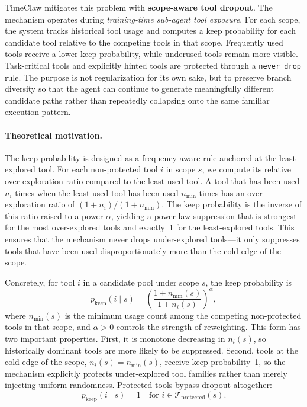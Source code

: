 TimeClaw mitigates this problem with \textbf{scope-aware tool dropout}. The mechanism operates during \emph{training-time sub-agent tool exposure}. For each scope, the system tracks historical tool usage and computes a keep probability for each candidate tool relative to the competing tools in that scope. Frequently used tools receive a lower keep probability, while underused tools remain more visible. Task-critical tools and explicitly hinted tools are protected through a \texttt{never\_drop} rule. The purpose is not regularization for its own sake, but to preserve branch diversity so that the agent can continue to generate meaningfully different candidate paths rather than repeatedly collapsing onto the same familiar execution pattern.

\paragraph{Theoretical motivation.} The keep probability is designed as a frequency-aware rule anchored at the least-explored tool. For each non-protected tool $i$ in scope $s$, we compute its relative over-exploration ratio compared to the least-used tool. A tool that has been used $n_i$ times when the least-used tool has been used $n_{\min}$ times has an over-exploration ratio of $(1+n_i)/(1+n_{\min})$. The keep probability is the inverse of this ratio raised to a power $\alpha$, yielding a power-law suppression that is strongest for the most over-explored tools and exactly~1 for the least-explored tools. This ensures that the mechanism never drops under-explored tools---it only suppresses tools that have been used disproportionately more than the cold edge of the scope.

Concretely, for tool $i$ in a candidate pool under scope $s$, the keep probability is
\begin{equation}
\label{eq:keep}
p_{\mathrm{keep}}(i \mid s)=
\left(\frac{1+n_{\min}(s)}{1+n_i(s)}\right)^{\!\alpha},
\end{equation}
where $n_{\min}(s)$ is the minimum usage count among the competing non-protected tools in that scope, and $\alpha > 0$ controls the strength of reweighting. This form has two important properties. First, it is monotone decreasing in $n_i(s)$, so historically dominant tools are more likely to be suppressed. Second, tools at the cold edge of the scope, \ie $n_i(s)=n_{\min}(s)$, receive keep probability~1, so the mechanism explicitly protects under-explored tool families rather than merely injecting uniform randomness. Protected tools bypass dropout altogether:
\begin{equation}
p_{\mathrm{keep}}(i \mid s)=1 \quad \text{for } i \in \mathcal{T}_{\mathrm{protected}}(s).
\end{equation}

